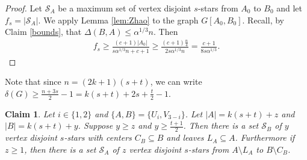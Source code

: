 \documentclass[oneside,12pt]{memoir}
\newtheorem{claim}[theorem]{Claim}
\begin{document}
\begin{proof}
Let $\mathcal{S}_A$ be a maximum set of vertex disjoint $s$-stars from $A_0$ to $B_0$ and let $f_s=|\mathcal{S}_A|$.  We apply Lemma \ref{lem:Zhao} to the graph $G[A_0,B_0]$.   Recall, by Claim \ref{bounds}, that $\Delta(B,A)\leq \alpha^{1/3} n$.  Then
\begin{align*}
f_s\geq \frac{(c+1)|A_0|}{s\alpha^{1/3}n+c+1}\geq\frac{(c+1)\frac{n}{4}}{2s\alpha^{1/3}n}=\frac{c+1}{8s\alpha^{1/3}}.
\end{align*}

\end{proof}

Note that since $n=(2k+1)(s+t)$, we can write $\delta(G)\geq \frac{n+3s}{2}-1=k(s+t)+2s+\frac{t}{2}-1$.  


\begin{claim} \label{Stars}Let $i\in\{1,2\}$ and $\{A,B\}=\{U_i,V_{3-i}\}$.  Let $|A|=k(s+t)+z$ and $|B|=k(s+t)+y$.  Suppose $y\geq z$ and $y\geq \frac{t+1}{2}$.  Then there is a set $\mathcal{S}_B$ of $y$ vertex disjoint $s$-stars with centers $C_B\subseteq B$ and leaves $L_A\subseteq A$.  Furthermore if $z\geq 1$, then there is a set $\mathcal{S}_A$ of $z$ vertex disjoint $s$-stars from $A\setminus L_A$ to $B\setminus C_B$.
\end{claim}
\end{document}
